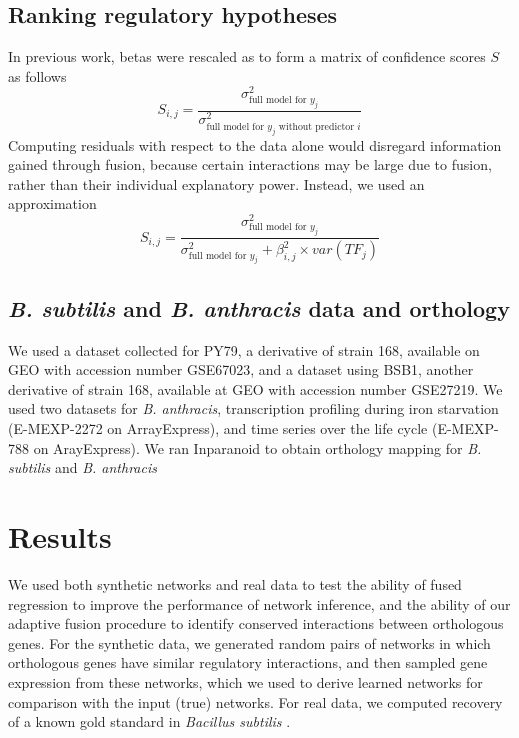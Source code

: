 \documentclass[11pt]{article}
\begin{document}
\subsection{Ranking regulatory hypotheses}
In previous work, betas were rescaled as to form a matrix of confidence scores $S$ as follows
\begin{equation}
S_{i,j} = \frac{\sigma^2_{\text{full model for }y_j}}{\sigma^2_{\text{full model for }y_j \text{ without predictor }i}}
\end{equation}
Computing residuals with respect to the data alone would disregard information gained through fusion, because certain interactions may be large due to fusion, rather than their individual explanatory power. Instead, we used an approximation
\begin{equation}
S_{i,j} = \frac{\sigma^2_{\text{full model for }y_j}}{\sigma^2_{\text{full model for }y_j} + \beta_{i,j}^2 \times var(TF_j)}
\end{equation}

\subsection{\textit{B. subtilis} and \textit{B. anthracis} data and orthology}
We used a dataset collected for PY79, a derivative of strain 168, available on GEO with accession number GSE67023, and a dataset using BSB1, another derivative of strain 168, available at GEO with accession number GSE27219. 
We used two datasets for \textit{B. anthracis}, transcription profiling during iron starvation (E-MEXP-2272 on ArrayExpress), and time series over the life cycle (E-MEXP-788 on ArayExpress). We ran Inparanoid to obtain orthology mapping for \textit{B. subtilis} and \textit{B. anthracis} \cite{ostlund_inparanoid_2010}

\section{Results}
We used both synthetic networks and real data to test the ability of fused regression to improve the performance of network inference, and the ability of our adaptive fusion procedure to identify conserved interactions between orthologous genes. 
For the synthetic data, we generated random pairs of networks in which orthologous genes have similar regulatory interactions, and then sampled gene expression from these networks, which we used to derive learned networks for comparison with the input (true) networks. 
For real data, we computed recovery of a known gold standard in \textit{Bacillus subtilis} \cite{michna_subtiwikidatabase_2014}. 
\end{document}
